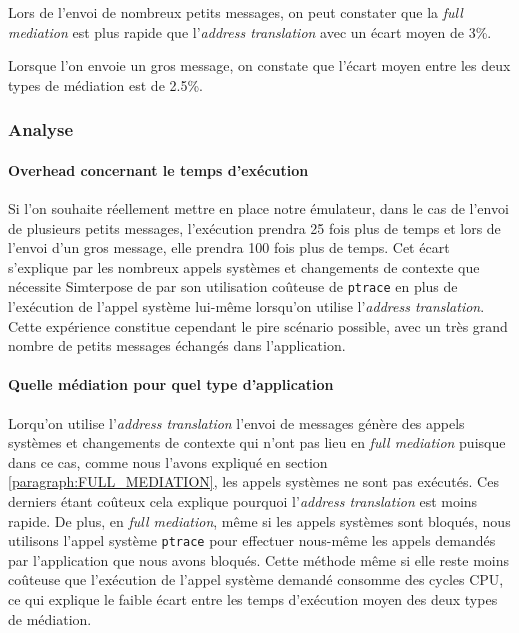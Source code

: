 Lors de l'envoi de nombreux petits messages, on peut constater que la \textit{full mediation} est plus rapide que l'\textit{address translation} avec un écart moyen de 3\%.

Lorsque l'on envoie un gros message, on constate que l'écart moyen entre les deux types de médiation est de 2.5\%.

\subsubsection{Analyse}
\paragraph{Overhead concernant le temps d'exécution}
Si l'on souhaite réellement mettre en place notre émulateur, dans le cas de l'envoi de plusieurs petits messages, l'exécution prendra 25 fois plus de temps et lors de l'envoi d'un gros message, elle prendra 100 fois plus de temps. Cet écart s'explique par les nombreux appels systèmes et changements de contexte que nécessite Simterpose de par son utilisation coûteuse de \texttt{ptrace} en plus de l'exécution de l'appel système lui-même lorsqu'on utilise l'\textit{address translation}. Cette expérience constitue cependant le pire scénario possible, avec un très grand nombre de petits messages échangés dans l'application.

\paragraph{Quelle médiation pour quel type d'application}
Lorqu'on utilise l'\textit{address translation} l'envoi de messages génère des appels systèmes et changements de contexte qui n'ont pas lieu en \textit{full mediation} puisque dans ce cas, comme nous l'avons expliqué en section \ref{paragraph:FULL_MEDIATION}, les appels systèmes ne sont pas exécutés. Ces derniers étant coûteux cela explique pourquoi l'\textit{address translation} est moins rapide. De plus, en \textit{full mediation}, même si les appels systèmes sont bloqués, nous utilisons l'appel système \texttt{ptrace} pour effectuer nous-même les appels demandés par l'application que nous avons bloqués. Cette méthode même si elle reste moins coûteuse que l'exécution de l'appel système demandé consomme des cycles CPU, ce qui explique le faible écart entre les temps d'exécution moyen des deux types de médiation.

